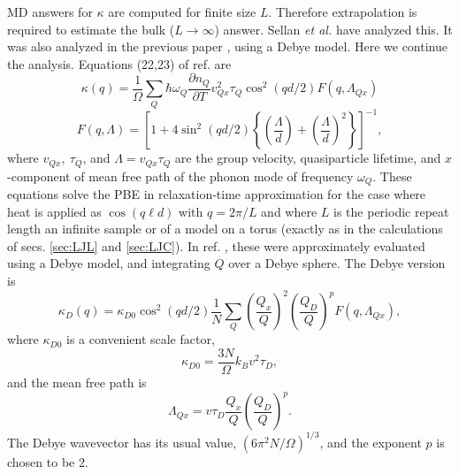 \documentclass[aps,prb,twocolumn,showpacs,superscriptaddress]{revtex4-1}\begin{tiny}\end{tiny}
\begin{document}
MD answers for $\kappa$ are computed for finite size $L$.  Therefore extrapolation is required
to estimate the bulk ($L\rightarrow \infty$) answer.  Sellan {\it et al.} \cite{Sellan} have analyzed this.
It was also analyzed in the previous paper \cite{Allen}, using a Debye model.  Here we continue the analysis.
Equations (22,23) of ref.  are
%
\begin{equation}
\kappa(q)=\frac{1}{\Omega}\sum_Q \hbar\omega_Q\frac{\partial n_Q}{\partial T} 
v_{Qx}^2 \tau_Q \cos^2(qd/2)   F(q,\Lambda_{Qx})
\label{eq:kappaslab1}
\end{equation}
%
\begin{equation}
F(q,\Lambda)=  \left[ 1 +4\sin^2 (qd/2)
\left\{ \left( \frac{\Lambda}{d} \right) + \left( \frac{\Lambda}{d} \right)^2 \right\} \right]^{-1} ,
\label{eq:kappaslab2}
\end{equation}
%
where $v_{Qx}, \ \tau_Q$, and $\Lambda=v_{Qx}\tau_Q$ are the group velocity, quasiparticle lifetime,
and $x$-component of
mean free path of the phonon mode of frequency $\omega_Q$.   These equations solve the PBE
in relaxation-time approximation for the case where heat is applied as $\cos(q\ell d)$ with $q=2\pi/L$
and where $L$ is the periodic repeat length an infinite sample or of a model on a torus (exactly as
in the calculations of secs. \ref{sec:LJL} and \ref{sec:LJC}).  In ref. , these were approximately
evaluated using a Debye model, and integrating $Q$ over a Debye sphere.  The Debye version is
%
\begin{equation}
\kappa_D(q)=\kappa_{D0} \cos^2 (qd/2) \frac{1}{N}\sum_Q \left( \frac{Q_x}{Q}\right)^2
\left(\frac{Q_D}{Q}\right)^p F(q,\Lambda_{Qx}),
\label{eq:D1}
\end{equation}
%
where $\kappa_{D0}$ is a convenient scale factor,
%
\begin{equation}
\kappa_{D0}=\frac{3N}{\Omega} k_B v^2 \tau_D,
\label{eq:D2}
\end{equation}
%
and the mean free path is
%
\begin{equation}
\Lambda_{Qx}=v\tau_D \frac{Q_x}{Q} \left(\frac{Q_D}{Q}\right)^p.
\label{eq:D3}
\end{equation}
%
The Debye wavevector has its usual value, $(6\pi^2 N/\Omega)^{1/3}$, and the exponent $p$ is
chosen to be 2.
\end{document}
